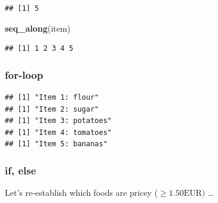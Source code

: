 \documentclass[
  11pt,
]{article}
\newenvironment{Shaded}{\begin{snugshade}}{\end{snugshade}}
\newcommand{\ControlFlowTok}[1]{\textcolor[rgb]{0.13,0.29,0.53}{\textbf{#1}}}
\newcommand{\FunctionTok}[1]{\textcolor[rgb]{0.13,0.29,0.53}{\textbf{#1}}}
\newcommand{\NormalTok}[1]{#1}
\newcommand{\SpecialCharTok}[1]{\textcolor[rgb]{0.81,0.36,0.00}{\textbf{#1}}}
\newcommand{\StringTok}[1]{\textcolor[rgb]{0.31,0.60,0.02}{#1}}
\begin{document}
\begin{verbatim}
## [1] 5
\end{verbatim}

\begin{Shaded}
\begin{Highlighting}[]
\FunctionTok{seq\_along}\NormalTok{(item)}
\end{Highlighting}
\end{Shaded}

\begin{verbatim}
## [1] 1 2 3 4 5
\end{verbatim}

\hypertarget{for-loop}{%
\subsubsection{for-loop}\label{for-loop}}

\begin{Shaded}
\end{Shaded}

\begin{verbatim}
## [1] "Item 1: flour"
## [1] "Item 2: sugar"
## [1] "Item 3: potatoes"
## [1] "Item 4: tomatoes"
## [1] "Item 5: bananas"
\end{verbatim}

\hypertarget{if-else}{%
\subsubsection{if, else}\label{if-else}}

Let's re-establish which foods are pricey (\(\geq 1.50\text{EUR})\) \ldots{}
\end{document}
